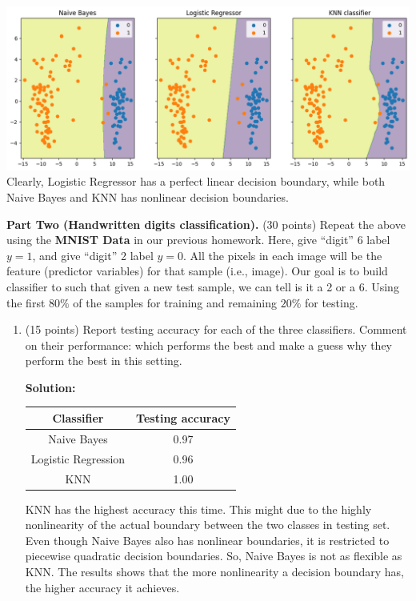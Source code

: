 \documentclass[twoside,10pt]{article}
\begin{document}
\begin{enumerate}
\begin{enumerate}
\begin{tcolorbox}
\includegraphics[width=\linewidth]{divorce.png}
Clearly, Logistic Regressor has a perfect linear decision boundary, while both Naive Bayes and KNN has nonlinear decision boundaries. 


\end{tcolorbox}
	
\end{enumerate}

\textbf{Part Two (Handwritten digits classification).} (30 points) Repeat the above using the \textbf{MNIST Data} in our previous homework. Here, give ``digit'' 6 label $y = 1$, and give ``digit'' 2 label $y = 0$. All the pixels in each image will be the feature (predictor variables) for that sample (i.e., image). Our goal is to build classifier to such that given a new test sample, we can tell is it a 2 or a 6. Using the first $80\%$ of the samples for training and remaining $20\%$ for testing. 
\begin{enumerate}
\item (15 points) Report testing accuracy for each of the three classifiers.  Comment on their performance: which performs the best and make a guess why they perform the best in this setting. 
\begin{tcolorbox}
\textbf{Solution:}\\
\begin{center}
	\begin{tabular}{| c | c |}
	\hline
	Classifier & Testing accuracy \\
	\hline
        Naive Bayes & 0.97 \\
        \hline
        Logistic Regression &0.96\\
        \hline
        KNN & 1.00\\
        \hline
        \end{tabular}
        \end{center}
KNN has the highest accuracy this time. This might due to the highly nonlinearity of the actual boundary between the two classes in testing set. Even though Naive Bayes also has nonlinear boundaries, it is restricted to piecewise quadratic decision boundaries. So, Naive Bayes is not as flexible as KNN. The results shows that the more nonlinearity a decision boundary has, the higher accuracy it achieves. 
\end{tcolorbox}


\end{enumerate}
\end{enumerate}
\end{document}
